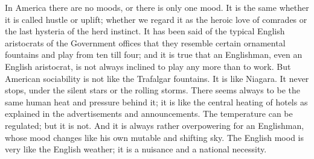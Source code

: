 \documentclass{book}
\begin{document}
In America there are no moods, or there is only one mood. It is the same whether it is called hustle or uplift; whether we regard it as the heroic love of comrades or the last hysteria of the herd instinct. It has been said of the typical English aristocrats of the Government offices that they resemble certain ornamental fountains and play from ten till four; and it is true that an Englishman, even an English aristocrat, is not always inclined to play any more than to work. But American sociability is not like the Trafalgar fountains. It is like Niagara. It never stops, under the silent stars or the rolling storms. There seems always to be the same human heat and pressure behind it; it is like the central heating of hotels as explained in the advertisements and announcements. The temperature can be regulated; but it is not. And it is always rather overpowering for an Englishman, whose mood changes like his own mutable and shifting sky. The English mood is very like the English weather; it is a nuisance and a national necessity.
\end{document}
